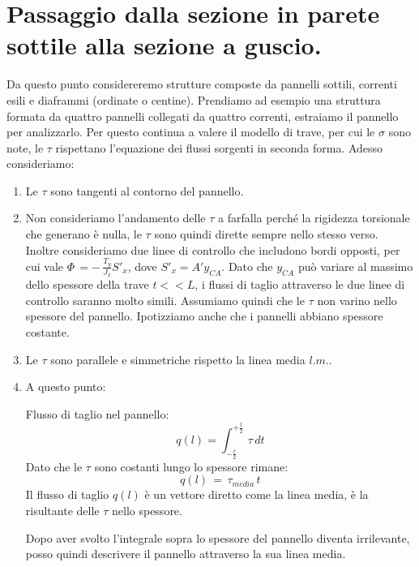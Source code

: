 \section{Passaggio dalla sezione in parete sottile alla sezione a guscio.}

Da questo punto considereremo strutture composte da pannelli sottili, correnti esili e diaframmi (ordinate o centine). Prendiamo ad esempio una struttura formata da quattro pannelli collegati da quattro correnti, estraiamo il pannello per analizzarlo. Per questo continua a valere il modello di trave, per cui le $\sigma$ sono note, le $\tau$ rispettano l'equazione dei flussi sorgenti in seconda forma. Adesso consideriamo:

\begin{enumerate}
    \item Le $\tau$ sono tangenti al contorno del pannello.\\
    \item Non consideriamo l'andamento delle $\tau$ a farfalla perché la rigidezza torsionale che generano è nulla, le $\tau$ sono quindi dirette sempre nello stesso verso. Inoltre consideriamo due linee di controllo che includono bordi opposti, per cui vale $ \Phi\, = -\, \frac{T_y}{J_x}S'_x $, dove $S'_x = A'y_{CA}$. Dato che $y_{CA}$ può variare al massimo dello spessore della trave $t<<L$, i flussi di taglio attraverso le due linee di controllo saranno molto simili. Assumiamo quindi che le $\tau$ non varino nello spessore del pannello. Ipotizziamo anche che i pannelli abbiano spessore costante.\\
    \item Le $\tau$ sono parallele e simmetriche rispetto la linea media $l.m.$.
    \item A questo punto:
    \begin{definizioneBox}
        Flusso di taglio nel pannello:
        \begin{equation*}
            q(l) = \int_{-\frac{t}{2}}^{+\frac{t}{2}} \, \tau \,dt
        \end{equation*}
        Dato che le $\tau $ sono costanti lungo lo spessore rimane:
        \begin{equation*}
            q(l) \,= \, \tau_{media} \,t
        \end{equation*}
        Il flusso di taglio $q(l)$ è un vettore diretto come la linea media, è la risultante delle $\tau$ nello spessore. 
    \end{definizioneBox}
    Dopo aver svolto l'integrale sopra lo spessore del pannello diventa irrilevante, posso quindi descrivere il pannello attraverso la sua linea media.

\end{enumerate}
